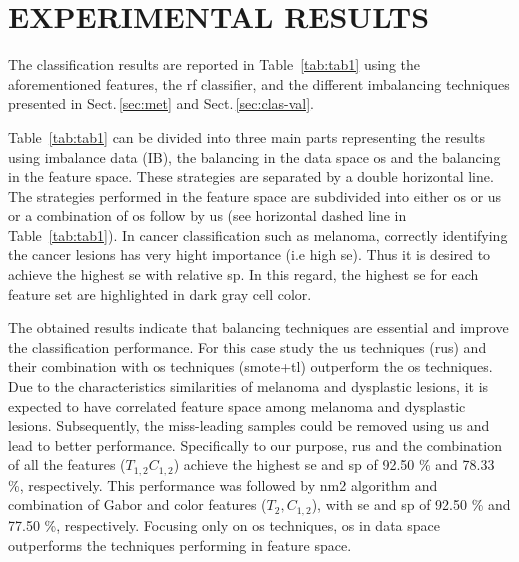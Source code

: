 \graphicspath{ {./content/Experiments-results/figures/} }


\section{\uppercase{Experimental Results}}
\label{sec:exp-res} 

\noindent The classification results are reported in Table~\ref{tab:tab1} using the aforementioned features, the \ac{rf} classifier, and the different imbalancing techniques presented in Sect.\,\ref{sec:met} and Sect.\,\ref{sec:clas-val}. 

Table~\ref{tab:tab1} can be divided into three main parts representing the results using imbalance data (IB), the balancing in the data space \ac{os} and the balancing in the feature space.
These strategies are separated by a double horizontal line.
The strategies performed in the feature space are subdivided into either \ac{os} or \ac{us} or a combination of \ac{os} follow by \ac{us} (see horizontal dashed line in Table~\ref{tab:tab1}).
In cancer classification such as melanoma, correctly identifying the cancer lesions has very hight importance (i.e high \ac{se}). 
Thus it is desired to achieve the highest \ac{se} with relative \ac{sp}. 
In this regard, the highest \ac{se} for each feature set are highlighted in dark gray cell color. 

The obtained results indicate that balancing techniques are essential and improve the classification performance. 
For this case study the \ac{us} techniques (\ac{rus}) and their combination with \ac{os} techniques (\ac{smote}+\ac{tl}) outperform the \ac{os} techniques. 
Due to the characteristics similarities of melanoma and dysplastic lesions, it is expected to have correlated feature space among melanoma and dysplastic lesions. 
Subsequently, the miss-leading samples could be removed using \ac{us} and lead to better performance.
Specifically to our purpose, \ac{rus} and the combination of all the features ($T_{1,2} C_{1,2}$) achieve the highest \ac{se} and \ac{sp} of 92.50 \% and 78.33 \%, respectively.
This performance was followed by \ac{nm2} algorithm and combination of Gabor and color features ($T_{2}, C_{1,2}$), with \ac{se} and \ac{sp} of 92.50 \% and 77.50 \%, respectively.  
Focusing only on \ac{os} techniques, \ac{os} in data space outperforms the techniques performing in feature space.


